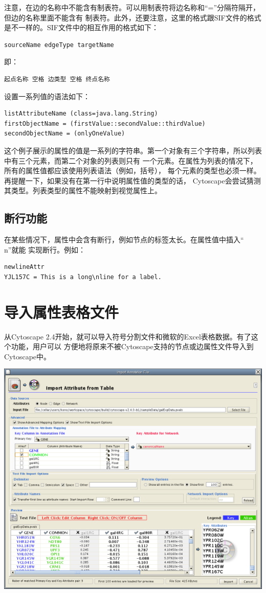 注意，在边的名称中不能含有制表符。可以用制表符将边名称和``=''分隔符隔开，但边的名称里面不能含有
制表符。此外，还要注意，这里的格式跟SIF文件的格式是不一样的。SIF文件中的相互作用的格式如下：

 \begin{verbatim}
sourceName edgeType targetName
\end{verbatim}

即：

\begin{verbatim}
起点名称 空格 边类型 空格 终点名称
\end{verbatim}

设置一系列值的语法如下：

 \begin{verbatim}
listAttributeName (class=java.lang.String)
firstObjectName = (firstValue::secondValue::thirdValue)
secondObjectName = (onlyOneValue)
\end{verbatim}

这个例子展示的属性的值是一系列的字符串。第一个对象有三个字符串，所以列表中有三个元素，而第二个对象的列表则只有
一个元素。在属性为列表的情况下，所有的属性值都应该使用列表语法（例如，括号），
每个元素的类型也必须一样。再提醒一下，如果没有在第一行中说明属性值的类型的话，
Cytoscape会尝试猜测其类型。列表类型的属性不能映射到视觉属性上。

\subsection{断行功能}
在某些情况下，属性中会含有断行，例如节点的标签太长。在属性值中插入``\\n''就能
实现断行。例如：

\begin{verbatim}
newlineAttr
YJL157C = This is a long\nline for a label.
\end{verbatim}

\section{导入属性表格文件}
从Cytoscape 2.4开始，就可以导入符号分割文件和微软的Excel表格数据。有了这个功能，用户可以
方便地将原来不被Cytoscape支持的节点或边属性文件导入到Cytoscape中。

\centerline{\includegraphics[width=.4\textwidth]{images/attribute_table_import_main.png} }

